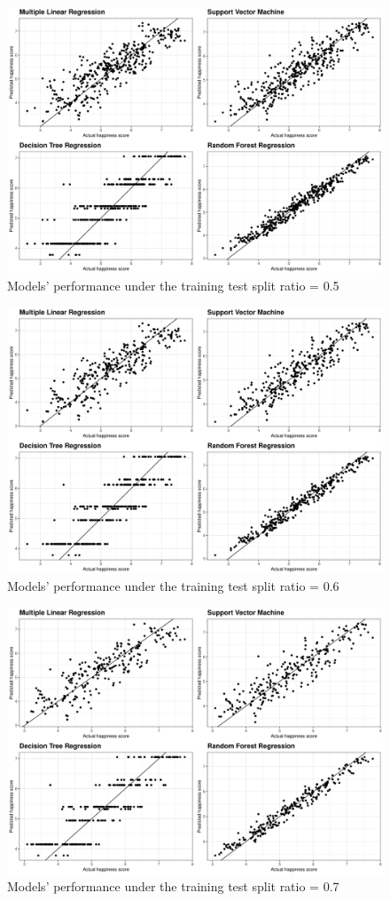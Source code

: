 \documentclass[11pt,a4paper,]{article}
\begin{document}
\begin{figure}

{\centering \includegraphics[width=0.7\linewidth]{figure/ggsp05} 

}

\caption{Models' performance under the training test split ratio = 0.5}\label{fig:ggsp05}
\end{figure}

\begin{figure}

{\centering \includegraphics[width=0.7\linewidth]{figure/ggsp06} 

}

\caption{Models' performance under the training test split ratio = 0.6}\label{fig:ggsp06}
\end{figure}

\begin{figure}

{\centering \includegraphics[width=0.7\linewidth]{figure/ggsp07} 

}

\caption{Models' performance under the training test split ratio = 0.7}\label{fig:ggsp07}
\end{figure}

\clearpage

\printbibliography
\end{document}
